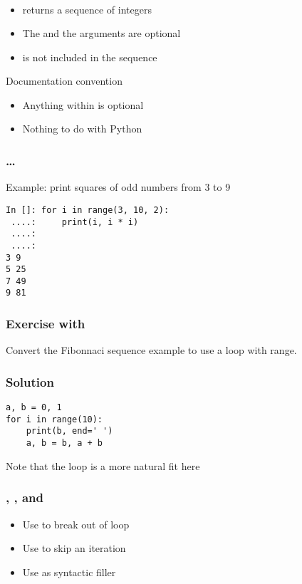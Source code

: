 \documentclass[14pt,compress]{beamer}
\begin{document}
\begin{frame}[fragile]
\frametitle{}
\\
\begin{itemize}
  \item {} returns a sequence of integers
  \item The  and the  arguments are optional
  \item {} is not included in the sequence
\end{itemize}
\vspace*{.5in}
\begin{block}{Documentation convention}
  \begin{itemize}
    \item \alert{Anything within \typ{[]} is optional}
    \item Nothing to do with Python
  \end{itemize}
\end{block}
\end{frame}

\begin{frame}[fragile]
  \frametitle{ \ldots {}}
Example: print squares of odd numbers from 3 to 9
  \begin{lstlisting}
In []: for i in range(3, 10, 2):
 ....:     print(i, i * i)
 ....:
 ....:
3 9
5 25
7 49
9 81
\end{lstlisting}
\end{frame}

\begin{frame}
  \frametitle{Exercise with }

Convert the Fibonnaci sequence example to use a  loop with range.

\end{frame}

\begin{frame}[fragile]
  \frametitle{Solution}
\begin{lstlisting}
a, b = 0, 1
for i in range(10):
    print(b, end=' ')
    a, b = b, a + b
\end{lstlisting}
  \vspace*{2em}
Note that the  loop is a more natural fit here
\end{frame}

\begin{frame}
  \frametitle{, , and\  }
  \begin{itemize}
  \item Use  to break out of loop
  \item Use  to skip an iteration
  \item Use  as syntactic filler
  \end{itemize}
\end{frame}
\end{document}
